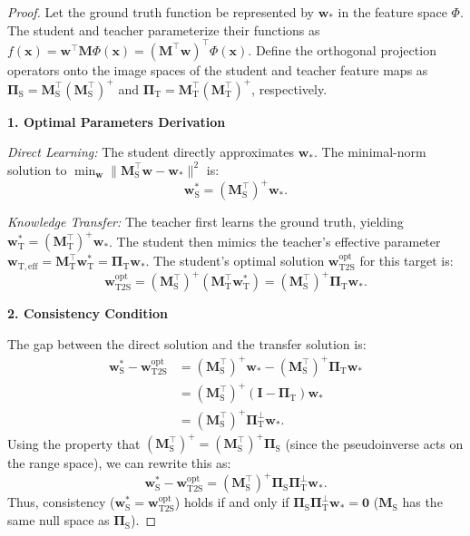\documentclass{article}
\theoremstyle{definition}
\theoremstyle{definition}
\theoremstyle{plain}
\theoremstyle{plain}
\theoremstyle{plain}
\theoremstyle{plain}
\theoremstyle{plain}
\newcommand{\bs}[1]{\boldsymbol{\mathbf{#1}}}
\newcommand{\vecx}{\mathbf{x}}
\newcommand{\te}{\mathrm{T}}
\newcommand{\st}{\mathrm{S}}
\newcommand{\ts}{\mathrm{T2S}}
\newcommand{\opt}{\mathrm{opt}}
\newcommand{\M}{\mathbf{M}}
\newcommand{\w}{\mathbf{w}}
\newcommand{\id}{\mathbf{I}}
\begin{document}
\begin{proof}
    Let the ground truth function be represented by $\w_*$ in the feature space $\Phi$. The student and teacher parameterize their functions as $f(\vecx) = \w^\top \M \Phi(\vecx) = (\M^\top \w)^\top \Phi(\vecx)$.
    Define the orthogonal projection operators onto the image spaces of the student and teacher feature maps as $\bs\Pi_\st = \M_\st^\top (\M_\st^\top)^+$ and $\bs\Pi_\te = \M_\te^\top (\M_\te^\top)^+$, respectively.

    \textbf{1. Optimal Parameters Derivation}
    
    \textit{Direct Learning:} The student directly approximates $\w_*$. The minimal-norm solution to $\min_\w \| \M_\st^\top \w - \w_* \|^2$ is:
    \begin{equation}
        \w^*_\st = (\M_\st^\top)^+ \w_*.
    \end{equation}

    \textit{Knowledge Transfer:} The teacher first learns the ground truth, yielding $\w^*_\te = (\M_\te^\top)^+ \w_*$. The student then mimics the teacher's effective parameter $\w_{\te,\text{eff}} = \M_\te^\top \w^*_\te = \bs\Pi_\te \w_*$. The student's optimal solution $\w^\opt_\ts$ for this target is:
    \begin{equation}
        \w_{\ts}^\opt = (\M_\st^\top)^+ (\M_\te^\top \w^*_\te) = (\M_\st^\top)^+ \bs\Pi_\te \w_*.
    \end{equation}

    \textbf{2. Consistency Condition}
    
    The gap between the direct solution and the transfer solution is:
    \begin{equation}
    \begin{aligned}
        \w^*_\st - \w_{\ts}^\opt &= (\M_\st^\top)^+ \w_* - (\M_\st^\top)^+ \bs\Pi_\te \w_* \\
        &= (\M_\st^\top)^+ (\id - \bs\Pi_\te) \w_* \\
        &= (\M_\st^\top)^+ \bs\Pi_\te^\perp \w_*.
    \end{aligned}
    \end{equation}
    Using the property that $(\M_\st^\top)^+ = (\M_\st^\top)^+ \bs\Pi_\st$ (since the pseudoinverse acts on the range space), we can rewrite this as:
    \begin{equation}
        \w^*_\st - \w_{\ts}^\opt = (\M_\st^\top)^+ \bs\Pi_\st \bs\Pi_\te^\perp \w_*.
    \end{equation}
    Thus, consistency ($\w^*_\st = \w_{\ts}^\opt$) holds if and only if $\bs\Pi_\st \bs\Pi_\te^\perp \w_* = \bs 0$ ($\M_\st$ has the same null space as $\bs\Pi_\st$).


\end{proof}
\end{document}
